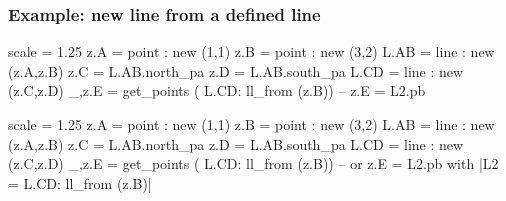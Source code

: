 \subsubsection{Example: new line from a defined line} %
\label{ssub:new_line_from_a_defined_line}
\begin{minipage}{0.5\textwidth}
\begin{tkzexample}[latex=0cm,small,code only]
\begin{tkzelements}
   scale = 1.25
   z.A   = point : new (1,1)
   z.B   = point : new (3,2)
   L.AB  = line : new (z.A,z.B)
   z.C   = L.AB.north_pa
   z.D   = L.AB.south_pa
   L.CD  = line : new (z.C,z.D)
   _,z.E   = get_points ( L.CD: ll_from (z.B))
   -- z.E   = L2.pb
\end{tkzelements}
\end{tkzexample}
\end{minipage}
\begin{minipage}{0.5\textwidth}
\begin{tkzelements}
scale = 1.25
z.A   = point : new (1,1)
z.B   = point : new (3,2)
L.AB  = line : new (z.A,z.B)
z.C   = L.AB.north_pa
z.D   = L.AB.south_pa
L.CD  = line : new (z.C,z.D)
_,z.E   = get_points ( L.CD: ll_from (z.B))
-- or  z.E   = L2.pb with |L2 = L.CD: ll_from (z.B)|
\end{tkzelements}
\hspace*{\fill}
\hspace*{\fill}
\end{minipage}


